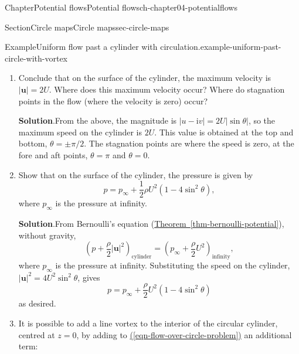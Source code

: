 \documentclass[oneside,10pt,]{book}
\newcommand{\blocktitlefont}{\relax}
\newcommand{\xreffont}{\relax}
\numberwithin{equation}{section}
\newcommand{\e}{\mathrm{e}}
\newcommand{\im}{\mathrm{i}}
\newcommand{\bu}{\boldsymbol{u}}
\begin{document}
\begin{chapterptx}{Chapter}{Potential flows}{}{Potential flows}{}{}{ch-chapter04-potentialflows}
\begin{sectionptx}{Section}{Circle maps}{}{Circle maps}{}{}{sec-circle-maps}
\begin{example}{Example}{Uniform flow past a cylinder with circulation.}{example-uniform-past-circle-with-vortex}
\begin{enumerate}[font=\bfseries,label=(\alph*),ref=\alph*]
\begin{equation*}
w'(z) = u - \im v = U\left(1 - \frac{a^2}{z^2}\right).
\end{equation*}
Substituting \(z = a\e^{\im\theta}\) and simplifying gives%
\begin{equation*}
u - \im v = U \e^{-\im \theta}\left( \e^{\im\theta} - \e^{-\im\theta}\right) = 2U \e^{\im(\pi/2 - \theta)} \sin\theta.
\end{equation*}
%
\item{}Conclude that on the surface of the cylinder, the maximum velocity is \(|\bu| = 2U\). Where does this maximum velocity occur? Where do stagnation points in the flow (where the velocity is zero) occur?%
\par\smallskip%
\noindent\textbf{\blocktitlefont Solution}.\hypertarget{example-uniform-past-circle-with-vortex-5-2}{}\quad{}From the above, the magnitude is \(|u - \im v| = 2U|\sin\theta|\), so the maximum speed on the cylinder is \(2U\). This value is obtained at the top and bottom, \(\theta = \pm \pi/2\). The stagnation points are where the speed is zero, at the fore and aft points, \(\theta = \pi\) and \(\theta = 0\).%
\item{}Show that on the surface of the cylinder, the pressure is given by%
\begin{equation*}
p = p_\infty + \frac{1}{2} \rho U^2(1 - 4\sin^2\theta),
\end{equation*}
where \(p_\infty\) is the pressure at infinity.%
\par\smallskip%
\noindent\textbf{\blocktitlefont Solution}.\hypertarget{example-uniform-past-circle-with-vortex-6-2}{}\quad{}From Bernoulli's equation (\hyperref[thm-bernoulli-potential]{Theorem~{\xreffont\ref{thm-bernoulli-potential}}}), without gravity,%
\begin{equation*}
\left(p + \frac{\rho}{2} |\bu|^2\right)_{\text{cylinder}} = \left(p_\infty + \frac{\rho}{2} U^2\right)_{\text{infinity}},
\end{equation*}
where \(p_\infty\) is the pressure at infinity. Substituting the speed on the cylinder, \(|\bu|^2 = 4U^2\sin^2\theta\), gives%
\begin{equation*}
p = p_\infty + \frac{\rho}{2}U^2(1 - 4\sin^2\theta)
\end{equation*}
as desired.%
\item{}It is possible to add a line vortex to the interior of the circular cylinder, centred at \(z = 0\), by adding to \hyperref[eqn-flow-over-circle-problem]{({\xreffont\ref{eqn-flow-over-circle-problem}})} an additional term:%

\end{enumerate}
\end{example}
\end{sectionptx}
\end{chapterptx}
\end{document}
